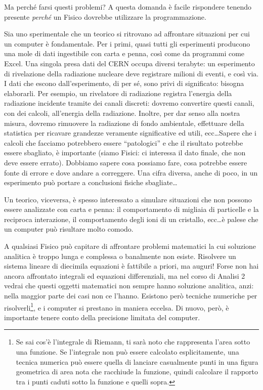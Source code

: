 	Ma perché farsi questi problemi? A questa domanda è facile rispondere tenendo presente \emph{perché} un Fisico dovrebbe utilizzare la programmazione.
	
	Sia uno sperimentale che un teorico si ritrovano ad affrontare situazioni per cui un computer è fondamentale. Per i primi, quasi tutti gli esperimenti producono una mole di dati ingestibile con carta e penna, così come da programmi come Excel. Una singola presa dati del CERN occupa diversi terabyte: un esperimento di rivelazione della radiazione nucleare deve registrare milioni di eventi, e così via. I dati che escono dall'esperimento, di per sé, sono privi di significato: bisogna elaborarli. Per esempio, un rivelatore di radiazione registra l'energia della radiazione incidente tramite dei canali discreti: dovremo convertire questi canali, con dei calcoli, all'energia della radiazione. Inoltre, per dar senso alla nostra misura, dovremo rimuovere la radiazione di fondo ambientale, effettuare della statistica per ricavare grandezze veramente significative ed utili, ecc\ldots Sapere che i calcoli che facciamo potrebbero essere ``patologici'' e che il risultato potrebbe essere sbagliato, è importante (siamo Fisici: ci interessa il dato finale, che non deve essere errato). Dobbiamo sapere cosa possiamo fare, cosa potrebbe essere fonte di errore e dove andare a correggere. Una cifra diversa, anche di poco, in un esperimento può portare a conclusioni fisiche sbagliate\ldots
	
	Un teorico, viceversa, è spesso interessato a simulare situazioni che non possono essere analizzate con carta e penna: il comportamento di migliaia di particelle e la reciproca interazione, il comportamento degli ioni di un cristallo, ecc\ldots è palese che un computer può risultare molto comodo. 
	
	A qualsiasi Fisico può capitare di affrontare problemi matematici la cui soluzione analitica è troppo lunga e complessa o banalmente non esiste. Risolvere un sistema lineare di diecimila equazioni è fattibile a priori, ma auguri! Forse non hai ancora affrontato integrali ed equazioni differenziali, ma nel corso di Analisi 2 vedrai che questi oggetti matematici non sempre hanno soluzione analitica, anzi: nella maggior parte dei casi non ce l'hanno. Esistono però tecniche numeriche per risolverli\footnote{Se sai cos'è l'integrale di Riemann, ti sarà noto che rappresenta l'area sotto una funzione. Se l'integrale non può essere calcolato esplicitamente, una tecnica numerica può essere quella di lanciare casualmente punti in una figura geometrica di area nota che racchiude la funzione, quindi calcolare il rapporto tra i punti caduti sotto la funzione e quelli sopra.}, e i computer si prestano in maniera eccelsa. Di nuovo, però, è importante tenere conto della precisione limitata del computer.
	
